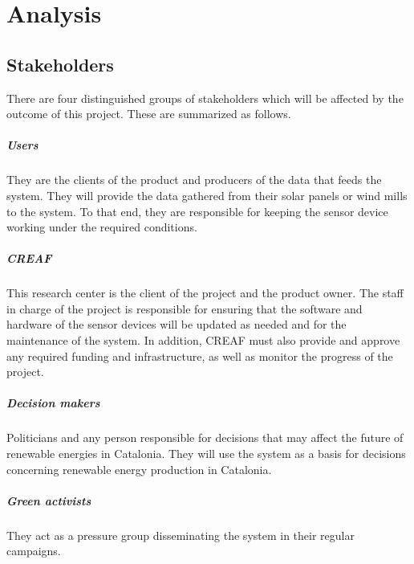 \chapter{Analysis}

\section{Stakeholders}

There are four distinguished groups of stakeholders which will be affected by the outcome of this project. These are summarized as follows.

\paragraph{Users} They are the clients of the product and producers of the data that feeds the system. They will provide the data gathered from their solar panels or wind mills to the system. To that end, they are responsible for keeping the sensor device working under the required conditions.
\paragraph{CREAF} This research center is the client of the project and the product owner. The staff in charge of the project is responsible for ensuring that the software and hardware of the sensor devices will be updated as needed and for the maintenance of the system. In addition, CREAF must also provide and approve any required funding and infrastructure, as well as monitor the progress of the project.
\paragraph{Decision makers} Politicians and any person responsible for decisions that may affect the future of renewable energies in Catalonia. They will use the system as a basis for decisions concerning renewable energy production in Catalonia.
\paragraph{Green activists} They act as a pressure group disseminating the system in their regular campaigns.

